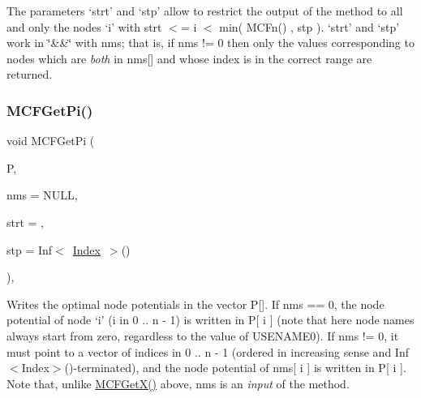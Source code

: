 The parameters `strt' and `stp' allow to restrict the output of the method to all and only the nodes `i' with strt $<$= i $<$ min( M\+C\+Fn() , stp ). `strt' and `stp' work in \char`\"{}\&\&\char`\"{} with nms; that is, if nms != 0 then only the values corresponding to nodes which are {\itshape both} in nms\mbox{[}\mbox{]} and whose index is in the correct range are returned. \mbox{\label{class_m_c_f_cplex_abb97afaf7df33019f1b728138a254d6d}} 
\subsubsection{\texorpdfstring{M\+C\+F\+Get\+Pi()}{MCFGetPi()}\hspace{0.1cm}{\footnotesize\ttfamily [3/3]}}
{\footnotesize\ttfamily void M\+C\+F\+Get\+Pi (\begin{DoxyParamCaption}\item[{\mbox{\hyperlink{class_m_c_f_class_a62409402be4e4b301e1a568f99f877be}{C\+Row}}}]{P,  }\item[{\mbox{\hyperlink{class_m_c_f_class_a81575b2d4e4d5636b17170432150ae69}{c\+Index\+\_\+\+Set}}}]{nms = {\ttfamily NULL},  }\item[{\mbox{\hyperlink{class_m_c_f_class_a76aaabb20535c51a2752b93f6c38fe54}{c\+Index}}}]{strt = {},  }\item[{\mbox{\hyperlink{class_m_c_f_class_ad53d6229d7ec28555a9c9c2fd9abf773}{Index}}}]{stp = {\ttfamily Inf$<$~\mbox{\hyperlink{class_m_c_f_class_ad53d6229d7ec28555a9c9c2fd9abf773}{Index}}~$>$()} }\end{DoxyParamCaption})\hspace{0.3cm}{\ttfamily [override]}, {\ttfamily [virtual]}}

Writes the optimal node potentials in the vector P\mbox{[}\mbox{]}. If nms == 0, the node potential of node `i' (i in 0 .. n -\/ 1) is written in P\mbox{[} i \mbox{]} (note that here node names always start from zero, regardless to the value of U\+S\+E\+N\+A\+M\+E0). If nms != 0, it must point to a vector of indices in 0 .. n -\/ 1 (ordered in increasing sense and Inf$<$\+Index$>$()-\/terminated), and the node potential of nms\mbox{[} i \mbox{]} is written in P\mbox{[} i \mbox{]}. Note that, unlike \mbox{\hyperlink{class_m_c_f_class_a4eb307e0707adaef99bb0e08c9e10eb8}{M\+C\+F\+Get\+X()}} above, nms is an {\itshape input} of the method.

